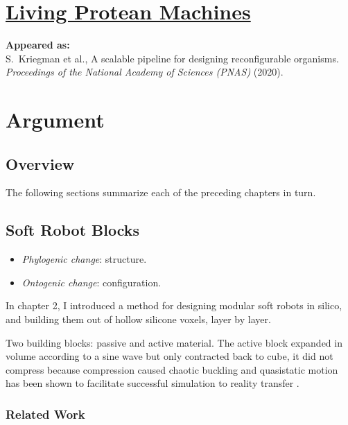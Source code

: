 \chapter{\href{https://www.pnas.org/content/117/4/1853}{\color{blue}Living Protean Machines}}

\textbf{Appeared as:}\\
S.~Kriegman et al., A scalable pipeline for designing reconfigurable organisms. 
\textit{Proceedings of the National Academy of Sciences (PNAS)} (2020).





\chapter{Argument}


\section{Overview}


The following sections summarize each of the preceding chapters in turn.


\section{Soft Robot Blocks}

\begin{itemize}
    \item \textit{Phylogenic change}: structure.
    \item \textit{Ontogenic change}: configuration.
\end{itemize}

\noindent
In chapter 2,
I introduced a method for 
designing modular soft robots in silico,
and
building them out of hollow silicone voxels, layer by layer.

Two building blocks: passive and active material.
The active block expanded in volume according to a sine wave but only contracted back to cube, 
it did not compress because compression caused chaotic buckling and quasistatic motion has been
shown to facilitate successful simulation to reality transfer \cite{lipson2000automatic}.

\subsection*{Related Work}

